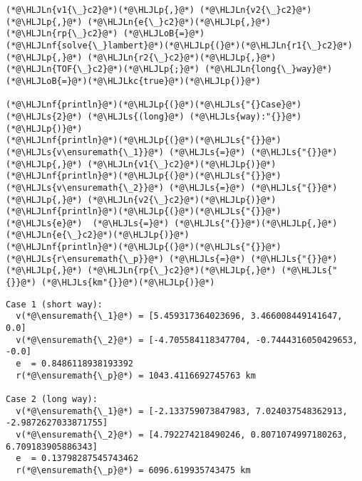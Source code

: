 \documentclass[12pt,a4paper]{article}
\newcommand{\HLJLkc}[1]{\textcolor[RGB]{59,151,46}{\textit{#1}}}
\newcommand{\HLJLn}[1]{#1}
\newcommand{\HLJLnf}[1]{\textcolor[RGB]{66,102,213}{#1}}
\newcommand{\HLJLs}[1]{\textcolor[RGB]{201,61,57}{#1}}
\newcommand{\HLJLoB}[1]{\textcolor[RGB]{102,102,102}{\textbf{#1}}}
\newcommand{\HLJLp}[1]{#1}
\begin{document}
\begin{lstlisting}
(*@\HLJLn{v1{\_}c2}@*)(*@\HLJLp{,}@*) (*@\HLJLn{v2{\_}c2}@*)(*@\HLJLp{,}@*) (*@\HLJLn{e{\_}c2}@*)(*@\HLJLp{,}@*) (*@\HLJLn{rp{\_}c2}@*) (*@\HLJLoB{=}@*) (*@\HLJLnf{solve{\_}lambert}@*)(*@\HLJLp{(}@*)(*@\HLJLn{r1{\_}c2}@*)(*@\HLJLp{,}@*) (*@\HLJLn{r2{\_}c2}@*)(*@\HLJLp{,}@*) (*@\HLJLn{TOF{\_}c2}@*)(*@\HLJLp{;}@*) (*@\HLJLn{long{\_}way}@*)(*@\HLJLoB{=}@*)(*@\HLJLkc{true}@*)(*@\HLJLp{)}@*)

(*@\HLJLnf{println}@*)(*@\HLJLp{(}@*)(*@\HLJLs{"{}Case}@*) (*@\HLJLs{2}@*) (*@\HLJLs{(long}@*) (*@\HLJLs{way):"{}}@*)(*@\HLJLp{)}@*)
(*@\HLJLnf{println}@*)(*@\HLJLp{(}@*)(*@\HLJLs{"{}}@*)  (*@\HLJLs{v\ensuremath{\_1}}@*) (*@\HLJLs{=}@*) (*@\HLJLs{"{}}@*)(*@\HLJLp{,}@*) (*@\HLJLn{v1{\_}c2}@*)(*@\HLJLp{)}@*)
(*@\HLJLnf{println}@*)(*@\HLJLp{(}@*)(*@\HLJLs{"{}}@*)  (*@\HLJLs{v\ensuremath{\_2}}@*) (*@\HLJLs{=}@*) (*@\HLJLs{"{}}@*)(*@\HLJLp{,}@*) (*@\HLJLn{v2{\_}c2}@*)(*@\HLJLp{)}@*)
(*@\HLJLnf{println}@*)(*@\HLJLp{(}@*)(*@\HLJLs{"{}}@*)  (*@\HLJLs{e}@*)  (*@\HLJLs{=}@*) (*@\HLJLs{"{}}@*)(*@\HLJLp{,}@*) (*@\HLJLn{e{\_}c2}@*)(*@\HLJLp{)}@*)
(*@\HLJLnf{println}@*)(*@\HLJLp{(}@*)(*@\HLJLs{"{}}@*)  (*@\HLJLs{r\ensuremath{\_p}}@*) (*@\HLJLs{=}@*) (*@\HLJLs{"{}}@*)(*@\HLJLp{,}@*) (*@\HLJLn{rp{\_}c2}@*)(*@\HLJLp{,}@*) (*@\HLJLs{"{}}@*) (*@\HLJLs{km"{}}@*)(*@\HLJLp{)}@*)
\end{lstlisting}

\begin{lstlisting}
Case 1 (short way):
  v(*@\ensuremath{\_1}@*) = [5.459317364023696, 3.466008449141647, 0.0]
  v(*@\ensuremath{\_2}@*) = [-4.705584118347704, -0.7444316050429653, -0.0]
  e  = 0.8486118938193392
  r(*@\ensuremath{\_p}@*) = 1043.4116692745763 km

Case 2 (long way):
  v(*@\ensuremath{\_1}@*) = [-2.133759073847983, 7.024037548362913, -2.9872627033871755]
  v(*@\ensuremath{\_2}@*) = [4.792274218490246, 0.8071074997180263, 6.709183905886343]
  e  = 0.13798287545743462
  r(*@\ensuremath{\_p}@*) = 6096.619935743475 km
\end{lstlisting}
\end{document}
